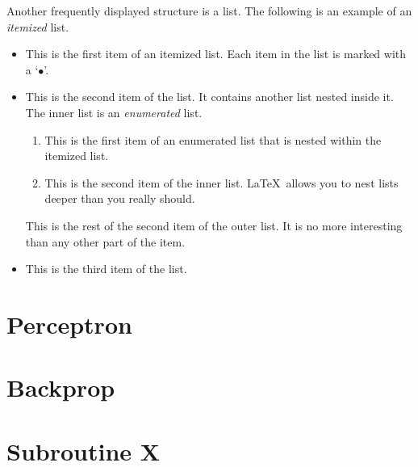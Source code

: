 \documentclass[12pt,halfline,a4paper]{ouparticle}
\begin{document}
Another frequently displayed structure is a list. The
following is an example of an \emph{itemized} list.
\begin{itemize}
   \item This is the first item of an itemized list.
         Each item in the list is marked with a
         `$\bullet$'.

   \item This is the second item of the list. It
         contains another list nested inside it. The
         inner list is an \emph{enumerated} list.
         \begin{enumerate}
            \item This is the first item of an enumerated
                  list that is nested within the
                  itemized list.

            \item This is the second item of the inner list.
                  \LaTeX\ allows you to nest lists
                  deeper than you really should.
         \end{enumerate}
         This is the rest of the second item of the
         outer list. It is no more interesting than
         any other part of the item.
   \item This is the third item of the list.
\end{itemize}


\pagebreak

\printbibliography[heading=bibintoc, title={References}]


\pagebreak
\appendix

\section{Perceptron}
\section{Backprop}
\section{Subroutine X}
\end{document}

